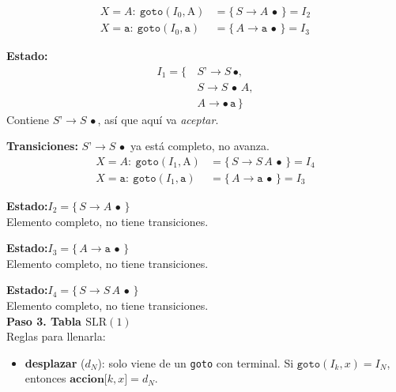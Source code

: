 \documentclass[12pt,letterpaper]{article}
\newcommand{\nt}[1]{\textit{#1}}
\newcommand{\tk}[1]{\texttt{#1}}
\newcommand{\tx}[1]{\text{#1}}
\newcommand{\slr}{\mathrm{SLR(1)}}
\begin{document}
\begin{enumerate}[label=\arabic*.]
  \[
  \begin{aligned}
    X=\nt{A}:\ \texttt{goto}(I_0,\tx{A}) &= \{\,\nt{S}\to\nt{A}\,\bullet\,\} = \boxed{I_2}\\[3pt]
    X=\tk{a}:\ \texttt{goto}(I_0,\tk{a}) &= \{\,\nt{A}\to\tk{a}\,\bullet\,\} = \boxed{I_3}
  \end{aligned}
  \]

  \bigskip
  \bigskip

  \textbf{Estado:}
  \[
  \begin{aligned}
    I_1 = \{\, & \nt{S'}\to\nt{S}\,\bullet,\\
               & \nt{S}\to\nt{S}\,\bullet\,\nt{A},\\
               & \nt{A}\to\bullet\,\tk{a}\,\}
  \end{aligned}
  \]
  Contiene $\nt{S'}\to\nt{S}\,\bullet$, así que aquí va \textit{aceptar}.

  \textbf{Transiciones:} $\nt{S'}\to\nt{S}\,\bullet$ ya está completo, no avanza.
  \[
  \begin{aligned}
    X=\nt{A}:\ \texttt{goto}(I_1,\tx{A}) &= \{\,\nt{S}\to\nt{S}\,\nt{A}\,\bullet\,\} = \boxed{I_4}\\[3pt]
    X=\tk{a}:\ \texttt{goto}(I_1,\tk{a}) &= \{\,\nt{A}\to\tk{a}\,\bullet\,\} = I_3
  \end{aligned}
  \]

  \medskip

  \textbf{Estado:}\quad $I_2 = \{\,\nt{S}\to\nt{A}\,\bullet\,\}$\\
  Elemento completo, no tiene transiciones.

  \medskip

  \textbf{Estado:}\quad $I_3 = \{\,\nt{A}\to\tk{a}\,\bullet\,\}$\\
  Elemento completo, no tiene transiciones.

  \medskip

  \textbf{Estado:}\quad $I_4 = \{\,\nt{S}\to\nt{S}\,\nt{A}\,\bullet\,\}$\\
  Elemento completo, no tiene transiciones.\\

  \textbf{Paso 3. Tabla $\slr$}\\
  Reglas para llenarla:
  \begin{itemize}
  \item \textbf{desplazar} ($d_N$): solo viene de un \texttt{goto} con terminal.
    Si $\texttt{goto}(I_k,x) = I_N$, entonces $\textbf{accion}\tk{[} k,x \tk{]} = d_N$.
    

\end{itemize}
\end{enumerate}
\end{document}
